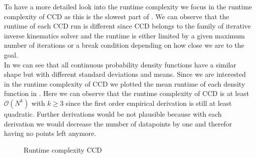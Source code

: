 To have a more detailed look into the runtime complexity we focus in the runtime complexity of CCD as this is the slowest part of . We can observe that the runtime of each CCD run is different since CCD belongs to the family of iterative inverse kinematics solver and the runtime is either limited by a given maximum number of iterations or a break condition depending on how close we are to the goal. \\
In  we can see that all continuous probability density functions have a similar shape but with different standard deviations and means. Since we are interested in the runtime complexity of CCD we plotted the mean runtime of each density function in . Here we can observe that the runtime complexity of CCD is at least $\mathcal{O}(N^k)$ with $k \geq 3$ since the first order empirical derivation is still at least quadratic. Further derivations would be not plausible because with each derivation we would decrease the number of datapoints by one and therefor having no points left anymore.
\begin{figure}
    \begin{center}
        \hfill
    \end{center}
    \caption[Runtime complexity CCD]{Runtime complexity CCD}
    \label{fig:expert_dataset}
\end{figure}


